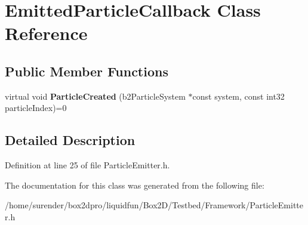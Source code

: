 \hypertarget{classEmittedParticleCallback}{\section{Emitted\-Particle\-Callback Class Reference}
\label{classEmittedParticleCallback}
}
\subsection*{Public Member Functions}
\begin{DoxyCompactItemize}
\item 
\hypertarget{classEmittedParticleCallback_a3f120672b12cbb95cb11bfd6b5ec59c2}{virtual void {\bfseries Particle\-Created} (b2\-Particle\-System $\ast$const system, const int32 particle\-Index)=0}\label{classEmittedParticleCallback_a3f120672b12cbb95cb11bfd6b5ec59c2}

\end{DoxyCompactItemize}


\subsection{Detailed Description}


Definition at line 25 of file Particle\-Emitter.\-h.



The documentation for this class was generated from the following file\-:\begin{DoxyCompactItemize}
\item 
/home/surender/box2dpro/liquidfun/\-Box2\-D/\-Testbed/\-Framework/Particle\-Emitter.\-h\end{DoxyCompactItemize}
